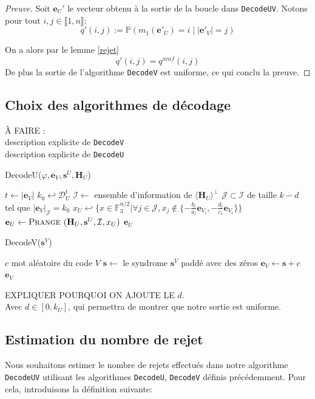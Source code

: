 \documentclass[12pt]{article}
\theoremstyle{plain}
\theoremstyle{definition}
\newcommand{\F}{\mathbb{F}}
\newcommand{\e}{\mathbf{e}}
\newcommand{\s}{\mathbf{s}}
\newcommand{\J}{\mathcal{J}}
\begin{document}
\begin{proof}[Preuve]
Soit $\e_U'$ le vecteur obtenu à la sortie de la boucle dans \verb|DecodeUV|.  Notons pour tout $i,j \in \llbracket 1,n \rrbracket$:
$$q'(i,j) := \mathbb{P}(m_1(\mathbf{e'}_U)=i\;|\;|\mathbf{e'}_V|=j)$$

\noindent On a alors par le lemme \ref{rejet}
$$q'(i,j) = q^{unif}(i,j)$$
De plus la sortie de l'algorithme \verb|DecodeV| est uniforme, ce qui conclu la preuve.
\end{proof}

\subsection{Choix des algorithmes de décodage}
À FAIRE :\\
description explicite de \verb|DecodeV| \\
description explicite de \verb|DecodeU| \\

\begin{algorithm}
	\caption{DecodeU($\varphi, \e_V, \s^U, \mathbf{H}_U$)}
	\begin{algorithmic}[1]
		\STATE $t \leftarrow |\e_V|$
		\STATE $k_0 \hookleftarrow \mathcal{D}_U^t$
		\REPEAT
		\STATE $\mathcal{I} \leftarrow$ ensemble d'information de $\langle\mathbf{H}_U\rangle^\perp$
		\STATE $\mathcal{J} \subset \mathcal{I}$ de taille $k-d$ tel que $|\e_V|_\mathcal{J} = k_0$
		\STATE $x_U \hookleftarrow \{x\in\F_3^{n/2} | \forall j\in\J,  x_j \notin \{-\frac{b_i}{a_i}\e_{V_i}, -\frac{d_i}{c_i}\e_{V_i}\}\}$
		\STATE $\e_U \leftarrow \textsc{Prange }(\mathbf{H}_U, \s^U, \mathcal{I}, x_U)$
		\UNTIL {$|\varphi(\e_U,\e_V)| \neq \omega$}
		\RETURN $\e_U$
    \end{algorithmic}
\end{algorithm}


\begin{algorithm}
	\caption{DecodeV($\s^V$)}
	\begin{algorithmic}[1]
    	\STATE $c$ mot aléatoire du code $V$
    	\STATE $\s \leftarrow$ le syndrome $\s^V$ paddé avec des zéros
    	\STATE $\e_V \leftarrow \s + c$
    	\RETURN $\e_V$
    \end{algorithmic}
\end{algorithm}

EXPLIQUER POURQUOI ON AJOUTE LE $d$.\\
Avec $d\in [0,k_U]$, qui permettra de montrer que notre sortie est uniforme.

\subsection{Estimation du nombre de rejet}
Nous souhaitons estimer le nombre de rejets effectués dans notre algorithme \verb|DecodeUV| utilisant les algorithmes \verb|DecodeU|, \verb|DecodeV| définis précédemment. Pour cela, introduisons la définition suivante:
\end{document}
